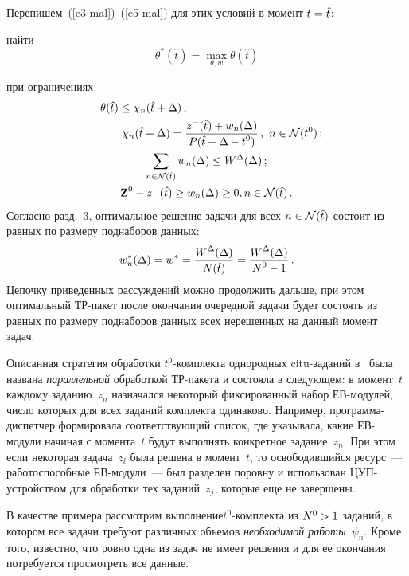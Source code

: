 \begin{multicols}{2}
Перепишем~(\ref{e3-mal})--(\ref{e5-mal}) для этих условий  в момент $t \hm= \hat t$:

найти
$$
\theta^*(\hat t) = \max\limits_{\theta, w} \theta(\hat t)        
$$

 при ограничениях
 \begin{gather*}
   \hspace*{-15mm}\theta(\hat t)  \le \chi_n(\hat t + \Delta)\,,\hspace*{25mm} \\
\hspace*{10mm}\chi_n(\hat t + \Delta) = \fr{z^-(\hat t) + w_{n}(\Delta)}{ P ( \hat t + \Delta - t^0) }\,, \ 
n \in \mathcal{N}(t^0)\,;\\
  \sum\limits_{n \in \mathcal{N}(\hat t )} w_n(\Delta ) \le  W^{\Delta} (\Delta )\,;\\
 \textbf{Z}^0 - z^-(\hat t) \ge  w_n(\Delta) \ge 0, n \in \mathcal{N}(\hat t)\,.
\end{gather*}
Согласно разд.~3, оптимальное решение задачи для всех $n \hm\in
\mathcal{N}(\hat t)$ состоит из равных  по размеру поднаборов данных:
$$
w^*_n(\Delta ) = w^* = \displaystyle\frac{\displaystyle W^{\Delta} (\Delta ) \mathstrut}{\displaystyle N(\hat t)\mathstrut} =  
\displaystyle\frac{\displaystyle  W^{\Delta} (\Delta ) \mathstrut}{\displaystyle  N^0 - 1\mathstrut}\,.
$$
Цепочку приведенных рассуждений можно продолжить дальше, при этом
оптимальный ТР-па\-кет после окончания очередной задачи будет состоять
из равных  по размеру поднаборов данных всех нерешенных на данный
момент задач.

Описанная стратегия обработки $t^0$-ком\-плек\-та однородных
citu-за\-да\-ний в~\cite{Prep11, Gol12} была названа
\textit{параллельной} обработкой ТР-па\-ке\-та и состояла в следующем: в
момент~$t$ каждому заданию~$z_n$  назначался некоторый фиксированный
набор ЕВ-мо\-ду\-лей, число которых для всех заданий комплекта
одинаково. Например, про\-грам\-ма-дис\-пет\-чер  формировала
соответствующий список, где указывала, какие ЕВ-мо\-ду\-ли  начиная с
момента~$t$ будут выполнять конкретное задание~$z_n$. При этом если
некоторая задача~$z_l$ была решена  в момент~$t$, то освободившийся
ресурс~---  работоспособные  ЕВ-мо\-ду\-ли~--- был разделен поровну и
использован ЦУП-устройством для обработки тех заданий~$z_j$, которые
еще не завершены.

В качестве примера рассмотрим выполнение\linebreak $t^0$-ком\-плек\-та  из $N^0 \hm>
1$ заданий, в котором все задачи требуют различных объемов
\textit{необходимой работы}~$\psi_n$. Кроме того, известно, что
ровно  одна из задач не имеет решения и для ее окончания потребуется
просмотреть все данные.


\end{multicols}
